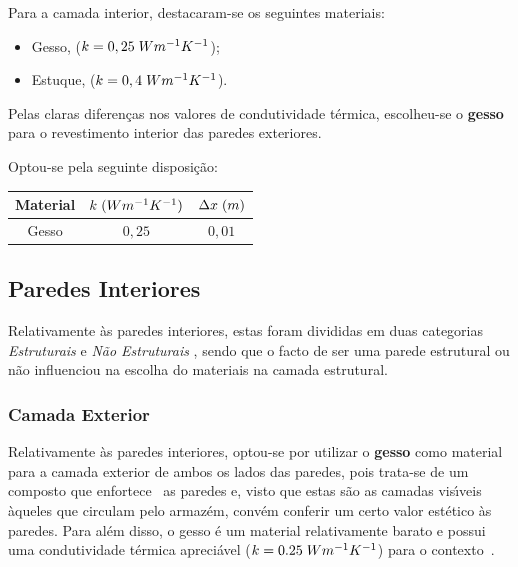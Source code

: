 \documentclass[12pt, a4paper]{article}
\begin{document}
Para a camada interior, destacaram-se os seguintes materiais:

\begin{center}
	\begin{itemize}
		\item Gesso, ($k=0,25 \hspace{1mm} Wm^{-1}K^{-1}$);
		\item Estuque, ($k=0,4 \hspace{1mm} Wm^{-1}K^{-1}$).
	\end{itemize}
\end{center}

Pelas claras diferenças nos valores de condutividade térmica, escolheu-se o \textbf{gesso} para o revestimento interior
das paredes exteriores.

Optou-se pela seguinte disposição:

\begin{center}
	\begin{tabular}{||c c c||}
		\hline
		Material & $k \hspace{1mm} (Wm^{-1}K^{-1})$ & $\Delta x \hspace{1mm} (m)$ \\ [0.5ex]
		\hline\hline
		Gesso    & $0,25$                           & $0,01$                      \\
		\hline
	\end{tabular}
\end{center}


\subsection{Paredes Interiores}\label{sub:paredes_int}

Relativamente \`as paredes interiores, estas foram divididas em duas categorias {\textemdash}
\emph{Estruturais} e \emph{N\~ao Estruturais} {\textemdash}, sendo que o facto de ser uma parede
estrutural ou n\~ao influenciou na escolha do materiais na camada estrutural. %

\subsubsection{Camada Exterior}\label{ssub:paredes_int_ext}

Relativamente \`as paredes interiores, optou-se por utilizar o \textbf{gesso} como material
para a camada exterior de ambos os lados das paredes, pois trata-se de um composto que
enfortece~\cite{gesso_vantagens} as paredes e, visto que estas s\~ao as camadas
vis\'{\i}veis \`aqueles que circulam pelo armaz\'em, conv\'em conferir um certo
valor est\'etico \`as paredes. Para al\'em disso, o gesso \'e um material relativamente barato
e possui uma condutividade t\'ermica apreci\'avel ($ k = 0.25 \hspace{1mm} Wm^{-1}K^{-1} $)
para o contexto~\cite{gesso_k}.
\end{document}
